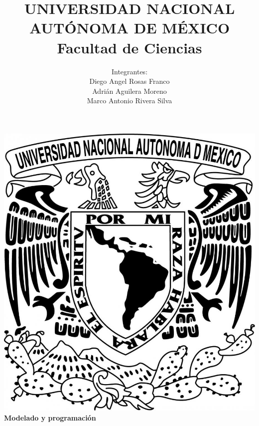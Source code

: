 \title{UNIVERSIDAD NACIONAL AUT\'ONOMA DE M\'EXICO\\ Facultad de Ciencias}
\author{Integrantes:\\
  Diego Angel Rosas Franco\\
  Adri\'an Aguilera Moreno\\
  Marco Antonio Rivera Silva}
\date{}
\maketitle
\begin{center}
  \includegraphics[scale=0.20]{../Portada/Portada}\\[0.4cm]
  \Large
  \bf{Modelado y programación}
  \normalsize
\end{center}
\newpage
{}

